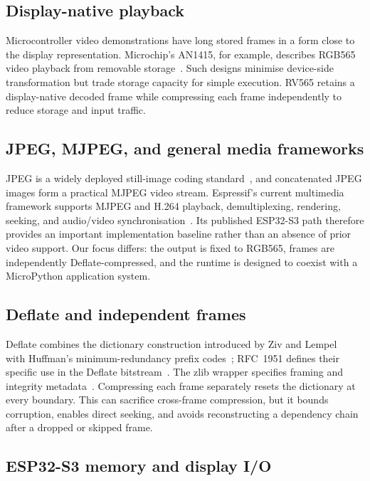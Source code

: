 \documentclass[11pt,twocolumn]{article}
\newcommand{\system}{RV565}
\begin{document}
\subsection{Display-native playback}

Microcontroller video demonstrations have long stored frames in a form close
to the display representation.  Microchip's AN1415, for example, describes
RGB565 video playback from removable storage~\cite{microchip2012video}.  Such
designs minimise device-side transformation but trade storage capacity for
simple execution.  \system{} retains a display-native decoded frame while
compressing each frame independently to reduce storage and input traffic.

\subsection{JPEG, MJPEG, and general media frameworks}

JPEG is a widely deployed still-image coding standard~\cite{wallace1991jpeg},
and concatenated JPEG images form a practical MJPEG video stream.  Espressif's
current multimedia framework supports MJPEG and H.264 playback, demultiplexing,
rendering, seeking, and audio/video synchronisation~\cite{espressif2026player}.
Its published ESP32-S3 path therefore provides an important implementation
baseline rather than an absence of prior video support.  Our focus differs:
the output is fixed to RGB565, frames are independently Deflate-compressed,
and the runtime is designed to coexist with a MicroPython application system.

\subsection{Deflate and independent frames}

Deflate combines the dictionary construction introduced by Ziv and
Lempel~\cite{ziv1977universal} with Huffman's minimum-redundancy prefix
codes~\cite{huffman1952method}; RFC~1951 defines their specific use in the
Deflate bitstream~\cite{deutsch1996deflate}.  The zlib wrapper specifies
framing and integrity metadata~\cite{deutsch1996zlib}.  Compressing each frame
separately resets the
dictionary at every boundary.  This can sacrifice cross-frame compression,
but it bounds corruption, enables direct seeking, and avoids reconstructing a
dependency chain after a dropped or skipped frame.

\subsection{ESP32-S3 memory and display I/O}
\end{document}
